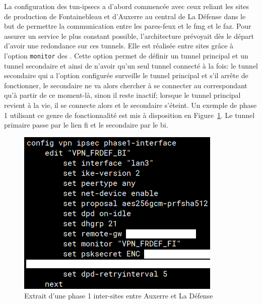 \documentclass[12pt, oneside, a4paper, titlepage]{report}
\begin{document}
La configuration des \glspl{tun-ipsec} a d'abord commencée avec ceux reliant les
sites de production de Fontainebleau et d'Auxerre au central de La Défense dans
le but de permettre la communication entre les pares-feux et le \gls{fmg} et le
\gls{faz}. Pour assurer un service le plus constant possible, l'architecture
prévoyait dès le départ d'avoir une redondance sur ces tunnels. Elle est
réalisée entre sites grâce à l'option \texttt{monitor} des .
Cette option permet de définir un tunnel principal et un tunnel secondaire et
ainsi de n'avoir qu'un seul tunnel connecté à la fois: le tunnel secondaire qui
a l'option configurée surveille le tunnel principal et s'il arrête de
fonctionner, le secondaire ne va alors chercher à se connecter au correspondant
qu'à partir de ce moment-là, sinon il reste inactif; lorsque le tunnel principal
revient à la vie, il se connecte alors et le secondaire s'éteint. Un exemple de
phase 1 utilisant ce genre de fonctionnalité est mis à disposition en
Figure~\ref{fig:fgt-auxr/ipsec-phase1}. Le tunnel primaire passe par le lien
\gls{fi} et le secondaire par le \gls{bi}.

\begin{figure}[h!]
    \centering
    \includegraphics[width = 0.6\linewidth]{img/fgt-auxr/ipsec-phase1.png}
    \caption{Extrait d'une phase 1 inter-sites entre Auxerre et La Défense}%
    \label{fig:fgt-auxr/ipsec-phase1}
\end{figure}
\end{document}
